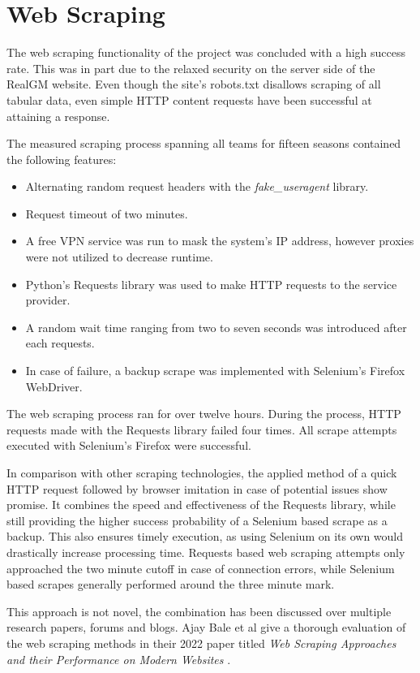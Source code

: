 \documentclass{thesis-ekf}
\theoremstyle{definition}
\theoremstyle{remark}
\begin{document}
\section{Web Scraping}
The web scraping functionality of the project was concluded with a high success rate. This was in part due to the relaxed security on the server side of the RealGM website. Even though the site's robots.txt disallows scraping of all tabular data, even simple HTTP content requests have been successful at attaining a response.

The measured scraping process spanning all teams for fifteen seasons contained the following features:
\begin{itemize}
	\item Alternating random request headers with the \emph{fake\_useragent} library.
	\item Request timeout of two minutes.
	\item A free VPN service was run to mask the system's IP address, however proxies were not utilized to decrease runtime.
	\item Python's Requests library was used to make HTTP requests to the service provider.
	\item A random wait time ranging from two to seven seconds was introduced after each requests.
	\item In case of failure, a backup scrape was implemented with Selenium's Firefox WebDriver.
\end{itemize}
The web scraping process ran for over twelve hours. During the process, HTTP requests made with the Requests library failed four times. All scrape attempts executed with Selenium's Firefox were successful.

In comparison with other scraping technologies, the applied method of a quick HTTP request followed by browser imitation in case of potential issues show promise. It combines the speed and effectiveness of the Requests library, while still providing the higher success probability of a Selenium based scrape as a backup. This also ensures timely execution, as using Selenium on its own would drastically increase processing time. Requests based web scraping attempts only approached the two minute cutoff in case of connection errors, while Selenium based scrapes generally performed around the three minute mark.

This approach is not novel, the combination has been discussed over multiple research papers, forums and blogs. Ajay Bale et al give a thorough evaluation of the web scraping methods in their 2022 paper titled \emph{Web Scraping Approaches and their Performance on Modern Websites} \cite{bale}.
\end{document}
